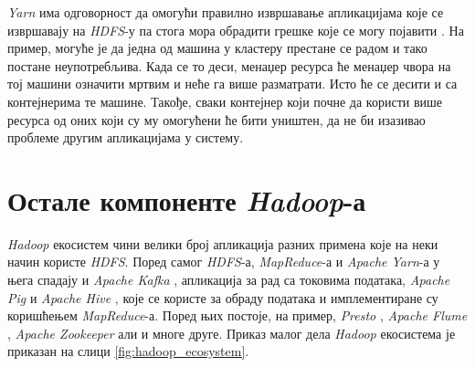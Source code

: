 \documentclass[12pt,oneside]{memoir}
\begin{document}

\textit{Yarn} има одговорност да омогући правилно извршавање апликацијама које се извршавају на \textit{HDFS}-у па стога мора обрадити грешке које се могу појавити \cite{hadoop_learning}. На пример, могуће је да једна од машина у кластеру престане се радом и тако постане неупотребљива. Када се то деси, менаџер ресурса ће менаџер чвора на тој машини означити мртвим и неће га више разматрати. Исто ће се десити и са контејнерима те машине. Такође, сваки контејнер који почне да користи више ресурса од оних који су му омогућени ће бити уништен, да не би изазивао проблеме другим апликацијама у систему.

\section{Остале компоненте \textit{Hadoop}-а}
\label{sec:ostale_komp_hadupa}

\textit{Hadoop} екосистем чини велики број апликација разних примена које на неки начин користе \textit{HDFS}. Поред самог \textit{HDFS}-а, \textit{MapReduce}-а и \textit{Apache Yarn}-а у њега спадају и \textit{Apache Kafka} \cite{apache_kafka}, апликација за рад са токовима података, \textit{Apache Pig} \cite{apache_pig} и \textit{Apache Hive} \cite{apache_hive}, које се користе за обраду података и имплементиране су коришћењем \textit{MapReduce}-а. Поред њих постоје, на пример,  \textit{Presto} \cite{presto}, \textit{Apache Flume} \cite{apache_flume}, \textit{Apache Zookeeper} \cite{apache_zookeeper} али и многе друге. Приказ малог дела \textit{Hadoop} екосистема је приказан на слици \ref{fig:hadoop_ecosystem}.
\end{document}
